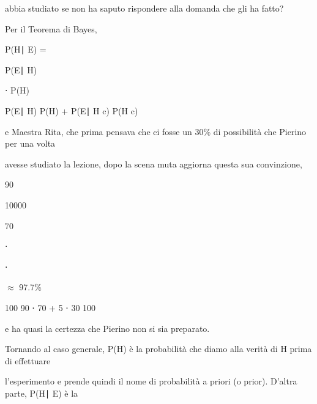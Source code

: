 \documentclass[a4paper,portrait,12pt]{article}
\begin{document}
\begin{flushleft}
abbia studiato se non ha saputo rispondere alla domanda che gli ha fatto?
\end{flushleft}


\begin{flushleft}
Per il Teorema di Bayes,
\end{flushleft}


\begin{flushleft}
P(H∣ E) =
\end{flushleft}





\begin{flushleft}
P(E∣ H)
\end{flushleft}


\begin{flushleft}
⋅ P(H)
\end{flushleft}


\begin{flushleft}
P(E∣ H) P(H) + P(E∣ H c) P(H c)
\end{flushleft}





\begin{flushleft}
e Maestra Rita, che prima pensava che ci fosse un 30\% di possibilit\`{a} che Pierino per una volta
\end{flushleft}


\begin{flushleft}
avesse studiato la lezione, dopo la scena muta aggiorna questa sua convinzione,
\end{flushleft}


90


10000


70


⋅


⋅


$\approx$ 97.7\%


100 90 ⋅ 70 + 5 ⋅ 30 100


\begin{flushleft}
e ha quasi la certezza che Pierino non si sia preparato.
\end{flushleft}


\begin{flushleft}
Tornando al caso generale, P(H) \`{e} la probabilit\`{a} che diamo alla verit\`{a} di H prima di effettuare
\end{flushleft}


\begin{flushleft}
l'esperimento e prende quindi il nome di probabilit\`{a} a priori (o prior). D'altra parte, P(H∣ E) \`{e} la
\end{flushleft}
\end{document}
